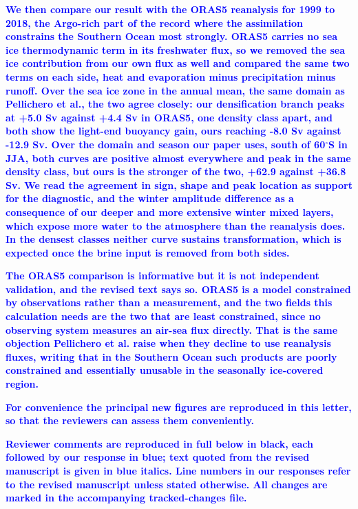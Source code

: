 \documentclass[pdflatex,sn-nature]{sn-jnl}
\begin{document}
\noindent\textcolor{blue}{\textbf{We then compare our result with the ORAS5 reanalysis for 1999 to 2018, the Argo-rich part of the record where the assimilation constrains the Southern Ocean most strongly. ORAS5 carries no sea ice thermodynamic term in its freshwater flux, so we removed the sea ice contribution from our own flux as well and compared the same two terms on each side, heat and evaporation minus precipitation minus runoff. Over the sea ice zone in the annual mean, the same domain as Pellichero et al., the two agree closely: our densification branch peaks at +5.0 Sv against +4.4 Sv in ORAS5, one density class apart, and both show the light-end buoyancy gain, ours reaching -8.0 Sv against -12.9 Sv. Over the domain and season our paper uses, south of 60$^\circ$S in JJA, both curves are positive almost everywhere and peak in the same density class, but ours is the stronger of the two, +62.9 against +36.8 Sv. We read the agreement in sign, shape and peak location as support for the diagnostic, and the winter amplitude difference as a consequence of our deeper and more extensive winter mixed layers, which expose more water to the atmosphere than the reanalysis does. In the densest classes neither curve sustains transformation, which is expected once the brine input is removed from both sides.}}


\noindent\textcolor{blue}{\textbf{The ORAS5 comparison is informative but it is not independent validation, and the revised text says so. ORAS5 is a model constrained by observations rather than a measurement, and the two fields this calculation needs are the two that are least constrained, since no observing system measures an air-sea flux directly. That is the same objection Pellichero et al. raise when they decline to use reanalysis fluxes, writing that in the Southern Ocean such products are poorly constrained and essentially unusable in the seasonally ice-covered region.}}


\noindent\textcolor{blue}{\textbf{For convenience the principal new figures are reproduced in this letter, so that the reviewers can assess them conveniently.}}


\noindent\textcolor{blue}{\textbf{Reviewer comments are reproduced in full below in black, each followed by our response in blue; text quoted from the revised manuscript is given in blue italics. Line numbers in our responses refer to the revised manuscript unless stated otherwise. All changes are marked in the accompanying tracked-changes file.}}
\end{document}
